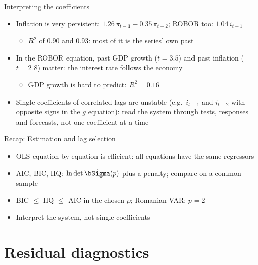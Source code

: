 \begin{frame}{Interpreting the coefficients}
\itemsize{\small}
\begin{itemize}
    \item Inflation is very persistent: $1.26\,\pi_{t-1} -0.35\,\pi_{t-2}$; ROBOR too: $1.04\,i_{t-1}$
    \begin{itemize}
        \item $R^2$ of 0.90 and 0.93: most of it is the series' own past
    \end{itemize}
    \item In the ROBOR equation, past GDP growth ($t = 3.5$) and past inflation ($t = 2.8$) matter: the interest rate follows the economy
    \begin{itemize}
        \item GDP growth is hard to predict: $R^2 = 0.16$
    \end{itemize}
    \item Single coefficients of correlated lags are unstable (e.g.\ $i_{t-1}$ and $i_{t-2}$ with opposite signs in the $g$ equation): read the system through tests, responses and forecasts, not one coefficient at a time
\end{itemize}
\end{frame}

\begin{frame}{Recap: Estimation and lag selection}
\itemsize{\small}
\begin{itemize}
    \item OLS equation by equation is efficient: all equations have the same regressors
    \item AIC, BIC, HQ: $\ln\det\tilde\bSigma(p)$ plus a penalty; compare on a common sample
    \item BIC $\le$ HQ $\le$ AIC in the chosen $p$; Romanian VAR: $p = 2$
    \item Interpret the system, not single coefficients
\end{itemize}
\end{frame}


\section{Residual diagnostics}

